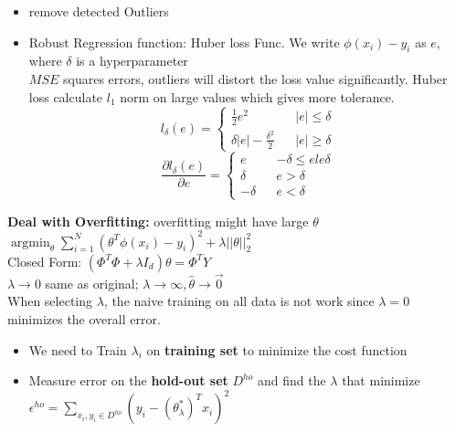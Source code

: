 \documentclass[10pt]{article}
\DeclareMathOperator*{\argmin}{\arg\min}
\begin{document}
\begin{multicols}{2}
\begin{enumerate}
\begin{itemize}
            \item remove detected Outliers
            \item Robust Regression function: Huber loss Func. We write $\phi(x_i) - y_i$ as $e$, where $\delta$ is a hyperparameter\\
            $MSE$ squares errors, outliers will distort the loss value significantly. Huber loss calculate $l_1$ norm on large values which gives more tolerance.
            $$
                l_{\delta} (e) = \left\{ 
                    \begin{array}{rcl}
                        \frac{1}{2}e^2 & & |e| \le \delta \\
                        \delta |e| - \frac{{\delta}^2}{2} & & |e| \ge \delta
                    \end{array} 
                    \right.
             $$
             $$
             \frac{\partial l_{\delta}(e)}{\partial e} = 
             \left\{
                 \begin{array}{rcl}
                    e & & -\delta \le e le \delta\\
                    \delta & & e > \delta\\
                    -\delta & & e < \delta
                 \end{array}
             \right.
             $$
        \end{itemize}
        \textbf{Deal with Overfitting:} overfitting might have large $\theta$\\
        $\argmin_{\theta} \sum_{i = 1}^{N}(\theta^T\phi(x_i) - y_i)^2 + \lambda ||\theta||^2_2$\\
        Closed Form: $(\Phi^T \Phi + \lambda I_d )\theta = \Phi^T Y$\\
        $\lambda \rightarrow 0$ same as original; $\lambda \rightarrow \infty, \hat{\theta}\rightarrow \vec{0}$ \\
        When selecting $\lambda$, the naive training on all data is not work since $\lambda = 0$ minimizes the overall error.
        \begin{itemize}
            \item We need to Train $\lambda_i$ on \textbf{training set} to minimize the cost function 
            \item Measure error on the \textbf{hold-out set} $D^{ho}$ and find the $\lambda$ that minimize $\epsilon^{ho} = \sum\limits_{x_i,y_i \in D^{ho} } (y_i - (\theta^*_{\lambda})^Tx_i)^2$
        \end{itemize}


\end{enumerate}
\end{multicols}
\end{document}
